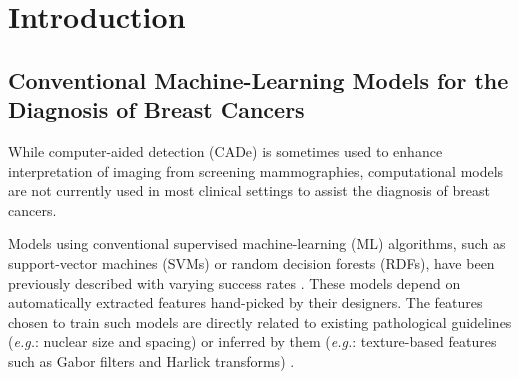 \section{Introduction}

\subsection{Conventional Machine-Learning Models for the Diagnosis of Breast Cancers}

While computer-aided detection (CADe) is sometimes used to enhance interpretation of imaging from screening mammographies, computational models are not currently used in most clinical settings to assist the diagnosis of breast cancers.\par

Models using conventional supervised machine-learning (ML) algorithms, such as support-vector machines (SVMs) or random decision forests (RDFs), have been previously described with varying success rates \citep{anuranjeeta2017, gertych2015}. These models depend on automatically extracted features hand-picked by their designers. The features chosen to train such models are directly related to existing pathological guidelines (\emph{e.g.}: nuclear size and spacing) or inferred by them (\emph{e.g.}: texture-based features such as Gabor filters and Harlick transforms) \citep{anuranjeeta2017, doyle2008}.\par



